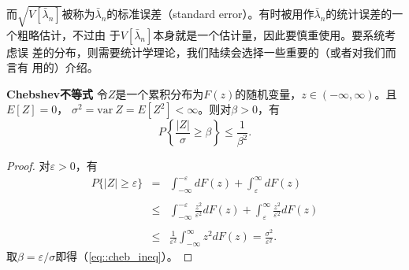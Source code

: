 而$\sqrt{V[\bar{\lambda}_n]}$被称为$\bar{\lambda}_n$的标准误差（standard
  error）。有时被用作$\bar{\lambda}_n$的统计误差的一个粗略估计，不过由
于$V[\bar{\lambda}_n]$本身就是一个估计量，因此要慎重使用。要系统考虑误
差的分布，则需要统计学理论，我们陆续会选择一些重要的（或者对我们而言有
  用的）介绍。

\begin{theorem}{\hei \bf Chebshev不等式}
  令$Z$是一个累积分布为$F(z)$的随机变量，$z \in (-\infty, \infty)$。且$E[Z] = 0$，
  $\sigma^2 = \mathrm{var~} Z = E[Z^2] < \infty$。则对$\beta > 0$，有
  \begin{equation}
    P\left\{\frac{|Z|}{\sigma} \geq \beta\right\} \leq \frac{1}{\beta^2}.
    \label{eq::cheb_ineq}
  \end{equation}
  \label{thm::cheb_ineq}
\end{theorem}

\begin{proof} 对$\varepsilon > 0$，有
  \begin{equation}
    \begin{array}{rcl}
    P\{|Z| \geq \varepsilon\} &=& \displaystyle
    \int_{-\infty}^{-\varepsilon}d F(z) + \int_{\varepsilon}^{\infty}d
    F(z) \\\\ &\leq& \displaystyle
    \int_{-\infty}^{-\varepsilon}\frac{z^2}{\varepsilon^2} d F(z)
    + \int_{\varepsilon}^{\infty}\frac{z^2}{\varepsilon^2} d F(z)\\\\
    &\leq& \displaystyle \frac{1}{\varepsilon^2}\int_{-\infty}^{\infty}z^2 d F(z)
    = \frac{\sigma^2}{\varepsilon^2}.
    \end{array}
  \end{equation}
  取$\beta = \varepsilon / \sigma$即得（\ref{eq::cheb_ineq}）。
\end{proof}

